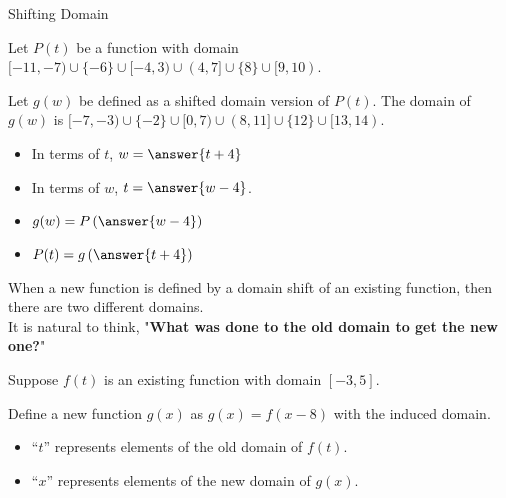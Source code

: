 \documentclass{ximera}
\begin{document}
\begin{example} Shifting Domain


Let $P(t)$ be a function with domain $[-11, -7) \cup \{ -6 \} \cup [-4,3) \cup (4, 7] \cup \{ 8 \} \cup [9, 10)$.

Let $g(w)$ be defined as a shifted domain version of $P(t)$.  The domain of $g(w)$ is $[-7, -3) \cup \{ -2 \} \cup [0,7) \cup (8, 11] \cup \{ 12 \} \cup [13, 14)$.

\begin{itemize}
\item In terms of $t$, $w = \answer{t+4}$ 
\item In terms of $w$, $t = \answer{w-4}$.  \\
\end{itemize}


\begin{itemize}
\item $g(w) = P\left(\answer{w-4}\right)$ \\

\item $P(t) = g\left(\answer{t+4}\right)$ \\
\end{itemize}

\end{example}














When a new function is defined by a domain shift of an existing function, then there are two different domains.  \\


It is natural to think, "\textbf{\textcolor{purple!85!blue}{What was done to the old domain to get the new one?}}"

Suppose $f(t)$ is an existing function with domain $[-3, 5]$.

Define a new function $g(x)$ as $g(x) = f(x-8)$ with the induced domain.



\begin{itemize}
\item ``$t$'' represents elements of the old domain of $f(t)$.  
\item ``$x$'' represents elements of the new domain of $g(x)$.  
\end{itemize}
\end{document}
